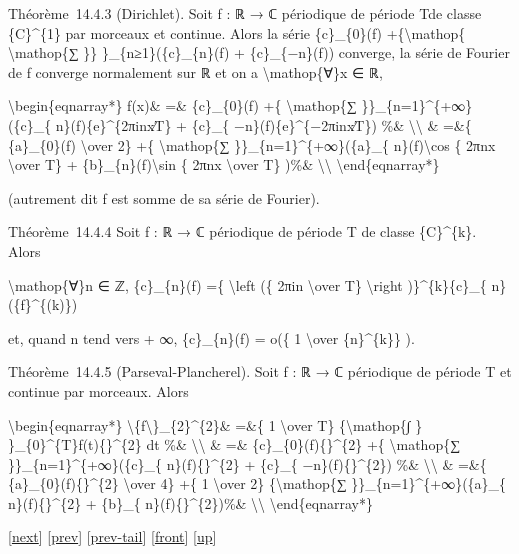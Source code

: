\documentclass[]{article}
\begin{document}
Théorème~14.4.3 (Dirichlet). Soit f : ℝ → ℂ périodique de période Tde
classe \{C\}\^{}\{1\} par morceaux et continue. Alors la série
\textbar{}\{c\}\_\{0\}(f)\textbar{} +\{\textbackslash{}mathop\{
\textbackslash{}mathop\{∑ \}\}
\}\_\{n≥1\}(\textbar{}\{c\}\_\{n\}(f)\textbar{} +
\textbar{}\{c\}\_\{−n\}(f)\textbar{}) converge, la série de Fourier de f
converge normalement sur ℝ et on a \textbackslash{}mathop\{∀\}x ∈ ℝ,

\textbackslash{}begin\{eqnarray*\} f(x)\& =\& \{c\}\_\{0\}(f) +\{
\textbackslash{}mathop\{∑ \}\}\_\{n=1\}\^{}\{+∞\}(\{c\}\_\{
n\}(f)\{e\}\^{}\{2πinx∕T\} + \{c\}\_\{ −n\}(f)\{e\}\^{}\{−2πinx∕T\})
\%\& \textbackslash{}\textbackslash{} \& =\&\{ \{a\}\_\{0\}(f)
\textbackslash{}over 2\} +\{ \textbackslash{}mathop\{∑
\}\}\_\{n=1\}\^{}\{+∞\}(\{a\}\_\{ n\}(f)\textbackslash{}cos \{ 2πnx
\textbackslash{}over T\} + \{b\}\_\{n\}(f)\textbackslash{}sin \{ 2πnx
\textbackslash{}over T\} )\%\& \textbackslash{}\textbackslash{}
\textbackslash{}end\{eqnarray*\}

(autrement dit f est somme de sa série de Fourier).

Théorème~14.4.4 Soit f : ℝ → ℂ périodique de période T de classe
\{C\}\^{}\{k\}. Alors

\textbackslash{}mathop\{∀\}n ∈ ℤ, \{c\}\_\{n\}(f) =\{
\textbackslash{}left (\{ 2πin \textbackslash{}over T\}
\textbackslash{}right )\}\^{}\{k\}\{c\}\_\{ n\}(\{f\}\^{}\{(k)\})

et, quand \textbar{}n\textbar{} tend vers + ∞, \{c\}\_\{n\}(f) = o(\{ 1
\textbackslash{}over \{n\}\^{}\{k\}\} ).

Théorème~14.4.5 (Parseval-Plancherel). Soit f : ℝ → ℂ périodique de
période T et continue par morceaux. Alors

\textbackslash{}begin\{eqnarray*\}
\textbackslash{}\textbar{}\{f\textbackslash{}\textbar{}\}\_\{2\}\^{}\{2\}\&
=\&\{ 1 \textbackslash{}over T\} \{\textbackslash{}mathop\{∫ \}
\}\_\{0\}\^{}\{T\}\textbar{}f(t)\{\textbar{}\}\^{}\{2\} dt \%\&
\textbackslash{}\textbackslash{} \& =\&
\textbar{}\{c\}\_\{0\}(f)\{\textbar{}\}\^{}\{2\} +\{
\textbackslash{}mathop\{∑ \}\}\_\{n=1\}\^{}\{+∞\}(\textbar{}\{c\}\_\{
n\}(f)\{\textbar{}\}\^{}\{2\} + \textbar{}\{c\}\_\{
−n\}(f)\{\textbar{}\}\^{}\{2\}) \%\& \textbackslash{}\textbackslash{} \&
=\&\{ \textbar{}\{a\}\_\{0\}(f)\{\textbar{}\}\^{}\{2\}
\textbackslash{}over 4\} +\{ 1 \textbackslash{}over 2\}
\{\textbackslash{}mathop\{∑ \}\}\_\{n=1\}\^{}\{+∞\}(\textbar{}\{a\}\_\{
n\}(f)\{\textbar{}\}\^{}\{2\} + \textbar{}\{b\}\_\{
n\}(f)\{\textbar{}\}\^{}\{2\})\%\& \textbackslash{}\textbackslash{}
\textbackslash{}end\{eqnarray*\}

{[}\href{coursse81.html}{next}{]} {[}\href{coursse79.html}{prev}{]}
{[}\href{coursse79.html\#tailcoursse79.html}{prev-tail}{]}
{[}\href{coursse80.html}{front}{]}
{[}\href{coursch15.html\#coursse80.html}{up}{]}
\end{document}
